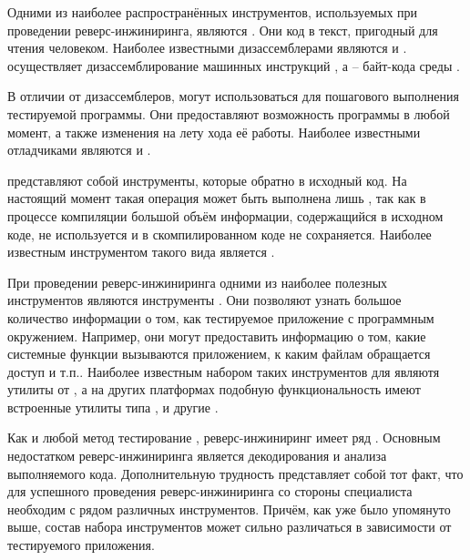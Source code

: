 %
Одними из наиболее распространённых инструментов, используемых при проведении реверс-инжиниринга, являются . 
%
Они  код в текст, пригодный для чтения человеком. 
%
Наиболее известными дизассемблерами являются   и  . 
%
 осуществляет дизассемблирование машинных инструкций , а  -- байт-кода среды  .

%
В отличии от дизассемблеров,  могут использоваться для пошагового выполнения тестируемой программы. 
%
Они предоставляют возможность  программы в любой момент, а также изменения на лету хода её работы. 
%
Наиболее известными отладчиками являются   и  .

%
 представляют собой инструменты, которые  обратно в исходный код. 
%
На настоящий момент такая операция может быть выполнена лишь , так как в процессе компиляции большой объём информации, содержащийся в исходном коде, не используется и в скомпилированном коде не сохраняется. 
%
Наиболее известным инструментом такого вида является  .

%
При проведении реверс-инжиниринга одними из наиболее полезных инструментов являются инструменты . 
%
Они позволяют узнать большое количество информации о том, как тестируемое приложение  с программным окружением. 
%
Например, они могут предоставить информацию о том, какие системные функции вызываются приложением, к каким файлам обращается доступ и т.п.. 
%
Наиболее известным набором таких инструментов для    являютя утилиты от  , а на других платформах подобную функциональность имеют встроенные утилиты типа ,  и другие .

%
Как и любой метод тестирование , реверс-инжиниринг имеет ряд  . 
%
Основным недостатком реверс-инжиниринга является  декодирования и анализа выполняемого кода. 
%
Дополнительную трудность представляет собой тот факт, что для успешного проведения реверс-инжиниринга со стороны специалиста необходим  с рядом различных инструментов. 
%
Причём, как уже было упомянуто выше, состав набора инструментов может сильно различаться в зависимости от тестируемого приложения.

